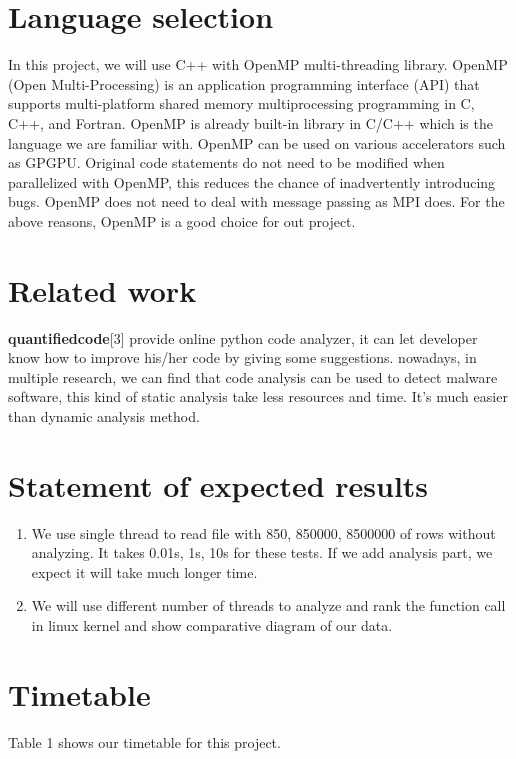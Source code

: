 \documentclass{acm_proc_article-sp}
\begin{document}
\section{Language selection}
	In this project, we will use C++ with OpenMP multi-threading library.
	OpenMP (Open Multi-Processing) is an application programming interface 
	(API) that supports multi-platform shared memory multiprocessing 
	programming in C, C++, and Fortran. OpenMP is already built-in library in 
	C/C++ which is the language we are familiar with. OpenMP can be used on 
	various accelerators such as GPGPU. Original code statements do not 
	need to be modified when parallelized with OpenMP, this reduces the chance 
	of inadvertently introducing bugs. OpenMP does not need to deal with message 
	passing as MPI does. For the above reasons, OpenMP is a good choice for 
	out project.
	
\section{Related work}

	\textbf{quantifiedcode}[3] provide online python code analyzer, it can let developer 
	know how to improve his/her code by giving some suggestions.
	nowadays, in multiple research, we can find that code analysis can be used to 
	detect malware software, this kind of static analysis take less resources and time. 
	It’s much easier than dynamic analysis method.

\section{Statement of expected results}
	\begin{enumerate}
		\item We use single thread to read file with 850, 850000, 8500000 of 
		rows without analyzing. It takes 0.01s, 1s, 10s for these tests. If we 
		add analysis part, we expect it will take much longer time.
		\item We will use different number of threads to analyze and rank 
		the function call in linux kernel and show comparative diagram of our data.
	\end{enumerate}


\section{Timetable}
	Table 1 shows our timetable for this project.
\end{document}
